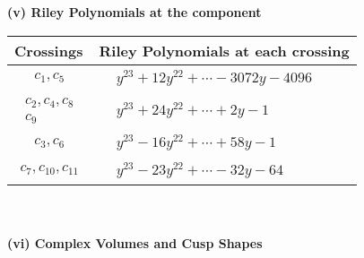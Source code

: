 \documentclass[1p]{elsarticle_modified}
\theoremstyle{definition}
\begin{document}
\newpage\renewcommand{\arraystretch}{1}
\flushleft \textbf{(v) Riley Polynomials at the component}\newline \\
\begin{tabular}{m{50pt}|m{274pt}}
Crossings & \hspace{64pt}Riley Polynomials at each crossing \\
\hline $$\begin{aligned}c_{1},c_{5}\end{aligned}$$&$\begin{aligned}
&y^{23}+12 y^{22}+\cdots-3072 y-4096
\end{aligned}$\\
\hline $$\begin{aligned}c_{2},c_{4},c_{8}\\c_{9}\end{aligned}$$&$\begin{aligned}
&y^{23}+24 y^{22}+\cdots+2 y-1
\end{aligned}$\\
\hline $$\begin{aligned}c_{3},c_{6}\end{aligned}$$&$\begin{aligned}
&y^{23}-16 y^{22}+\cdots+58 y-1
\end{aligned}$\\
\hline $$\begin{aligned}c_{7},c_{10},c_{11}\end{aligned}$$&$\begin{aligned}
&y^{23}-23 y^{22}+\cdots-32 y-64
\end{aligned}$\\
\hline
\end{tabular}\\~\\
\newpage\flushleft \textbf{(vi) Complex Volumes and Cusp Shapes}
\end{document}
